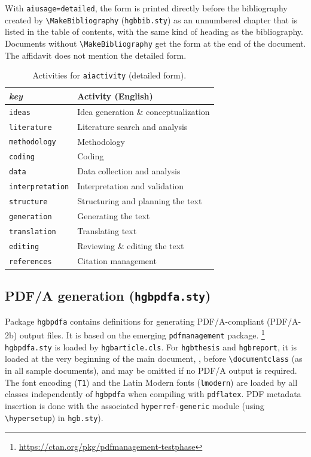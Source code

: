 \documentclass[language=english]{hgbarticle}
\begin{document}
With \texttt{aiusage=detailed}, the form is printed directly before the bibliography created by
\verb!\MakeBibliography! (\texttt{hgbbib.sty}) as an unnumbered chapter that is listed in
the table of contents, with the same kind of heading as the bibliography. Documents without
\verb!\MakeBibliography! get the form at the end of the document. The affidavit does not mention the
detailed form.

\begin{table}[H]
\caption{Activities for \texttt{\bs aiactivity} (detailed form).}
\label{tab:AIUsageActivities}
\centering\small
\begin{tabular}{@{}ll@{}}
	\toprule
	\textit{key} & Activity (English) \\
	\midrule
	\texttt{ideas}          & Idea generation \& conceptualization \\
	\texttt{literature}     & Literature search and analysis \\
	\texttt{methodology}    & Methodology \\
	\texttt{coding}         & Coding \\
	\texttt{data}           & Data collection and analysis \\
	\texttt{interpretation} & Interpretation and validation \\
	\texttt{structure}      & Structuring and planning the text \\
	\texttt{generation}     & Generating the text \\
	\texttt{translation}    & Translating text \\
	\texttt{editing}        & Reviewing \& editing the text \\
	\texttt{references}     & Citation management \\
	\bottomrule
\end{tabular}
\end{table}


\subsection{PDF/A generation (\texttt{hgbpdfa.sty})}

Package \texttt{hgbpdfa} contains definitions for generating PDF/A-compliant 
(PDF/A-2b) output files. It is based on the emerging  \texttt{pdfmanagement} package.%
\footnote{\url{https://ctan.org/pkg/pdfmanagement-testphase}}
\texttt{hgbpdfa.sty} is loaded by \texttt{hgbarticle.cls}. For \texttt{hgbthesis} and
\texttt{hgbreport}, it is loaded at the very beginning of the main document, \ie, before
\verb!\documentclass! (as in all sample documents), and may be omitted if no PDF/A output is
required. The font encoding (\texttt{T1}) and the Latin Modern fonts (\texttt{lmodern}) are loaded
by all classes independently of \texttt{hgbpdfa} when compiling with \texttt{pdflatex}.
PDF metadata insertion is done with the associated \texttt{hyperref-generic} 
module (using \verb!\hypersetup!) in \texttt{hgb.sty}).
\end{document}
